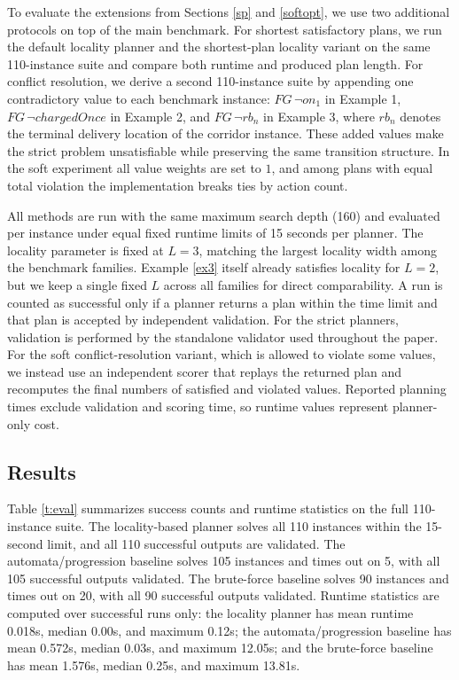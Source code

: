 \documentclass[a4paper,fleqn]{cas-dc}
\begin{document}
To evaluate the extensions from Sections \ref{sp} and \ref{softopt}, we use two additional protocols on top of the main benchmark. For shortest satisfactory plans, we run the default locality planner and the shortest-plan locality variant on the same 110-instance suite and compare both runtime and produced plan length. For conflict resolution, we derive a second 110-instance suite by appending one contradictory value to each benchmark instance: $FG\,\neg on_1$ in Example 1, $FG\,\neg chargedOnce$ in Example 2, and $FG\,\neg rb_n$ in Example 3, where $rb_n$ denotes the terminal delivery location of the corridor instance. These added values make the strict problem unsatisfiable while preserving the same transition structure. In the soft experiment all value weights are set to $1$, and among plans with equal total violation the implementation breaks ties by action count.

All methods are run with the same maximum search depth (160) and evaluated per instance under equal fixed runtime limits of 15 seconds per planner. The locality parameter is fixed at $L=3$, matching the largest locality width among the benchmark families. Example \ref{ex3} itself already satisfies locality for $L=2$, but we keep a single fixed $L$ across all families for direct comparability. A run is counted as successful only if a planner returns a plan within the time limit and that plan is accepted by independent validation. For the strict planners, validation is performed by the standalone validator used throughout the paper. For the soft conflict-resolution variant, which is allowed to violate some values, we instead use an independent scorer that replays the returned plan and recomputes the final numbers of satisfied and violated values. Reported planning times exclude validation and scoring time, so runtime values represent planner-only cost.

\subsection{Results}

Table \ref{t:eval} summarizes success counts and runtime statistics on the full 110-instance suite. The locality-based planner solves all 110 instances within the 15-second limit, and all 110 successful outputs are validated. The automata/progression baseline solves 105 instances and times out on 5, with all 105 successful outputs validated. The brute-force baseline solves 90 instances and times out on 20, with all 90 successful outputs validated. Runtime statistics are computed over successful runs only: the locality planner has mean runtime 0.018s, median 0.00s, and maximum 0.12s; the automata/progression baseline has mean 0.572s, median 0.03s, and maximum 12.05s; and the brute-force baseline has mean 1.576s, median 0.25s, and maximum 13.81s.
\end{document}
